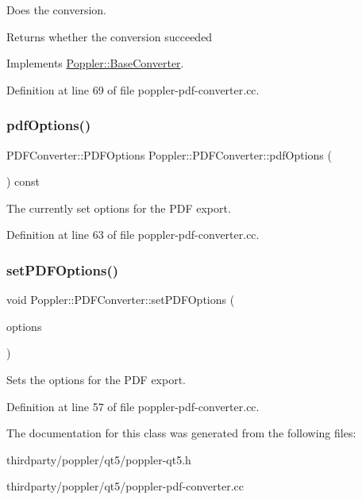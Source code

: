 Does the conversion.

\begin{DoxyReturn}{Returns}
whether the conversion succeeded 
\end{DoxyReturn}


Implements \hyperlink{class_poppler_1_1_base_converter_a272756d051ce3795a89772eaa93cadca}{Poppler\+::\+Base\+Converter}.



Definition at line 69 of file poppler-\/pdf-\/converter.\+cc.

\mbox{\label{class_poppler_1_1_p_d_f_converter_a11f0737be998533071c682d0d69cc736}} 
\subsubsection{\texorpdfstring{pdf\+Options()}{pdfOptions()}}
{\footnotesize\ttfamily P\+D\+F\+Converter\+::\+P\+D\+F\+Options Poppler\+::\+P\+D\+F\+Converter\+::pdf\+Options (\begin{DoxyParamCaption}{ }\end{DoxyParamCaption}) const}

The currently set options for the P\+DF export. 

Definition at line 63 of file poppler-\/pdf-\/converter.\+cc.

\mbox{\label{class_poppler_1_1_p_d_f_converter_a2d374a0ea57cc34139d816f1fe51d8a1}} 
\subsubsection{\texorpdfstring{set\+P\+D\+F\+Options()}{setPDFOptions()}}
{\footnotesize\ttfamily void Poppler\+::\+P\+D\+F\+Converter\+::set\+P\+D\+F\+Options (\begin{DoxyParamCaption}\item[{P\+D\+F\+Options}]{options }\end{DoxyParamCaption})}

Sets the options for the P\+DF export. 

Definition at line 57 of file poppler-\/pdf-\/converter.\+cc.



The documentation for this class was generated from the following files\+:\begin{DoxyCompactItemize}
\item 
thirdparty/poppler/qt5/poppler-\/qt5.\+h\item 
thirdparty/poppler/qt5/poppler-\/pdf-\/converter.\+cc\end{DoxyCompactItemize}
